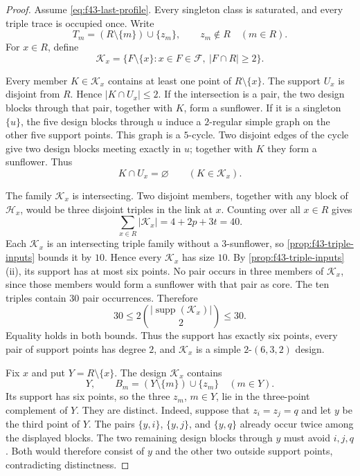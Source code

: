 \documentclass[11pt]{article}
\numberwithin{equation}{section}
\theoremstyle{definition}
\theoremstyle{remark}
\newcommand{\F}{\mathcal F}
\newcommand{\Hh}{\mathcal H}
\newcommand{\K}{\mathcal K}
\newcommand{\supp}{\operatorname{supp}}
\begin{document}
\begin{proof}
Assume \cref{eq:f43-last-profile}. Every singleton class is saturated, and
every triple trace is occupied once. Write
\[
 T_m=(R\setminus\{m\})\cup\{z_m\},
 \qquad z_m\notin R
 \quad(m\in R).
\]
For $x\in R$, define
\[
 \K_x=\{F\setminus\{x\}:x\in F\in\F,\ |F\cap R|\ge2\}.
\]

Every member $K\in\K_x$ contains at least one point of
$R\setminus\{x\}$. The support $U_x$ is disjoint from $R$. Hence
$|K\cap U_x|\le2$. If the intersection is a pair, the two design blocks
through that pair, together with $K$, form a sunflower. If it is a singleton
$\{u\}$, the five design blocks through $u$ induce a $2$-regular simple graph
on the other five support points. This graph is a $5$-cycle. Two disjoint
edges of the cycle give two design blocks meeting exactly in $u$; together
with $K$ they form a sunflower. Thus
\begin{equation}
 K\cap U_x=\varnothing\qquad(K\in\K_x).
 \label{eq:f43-K-avoids}
\end{equation}

The family $\K_x$ is intersecting. Two disjoint members, together with any
block of $\Hh_x$, would be three disjoint triples in the link at $x$.
Counting over all $x\in R$ gives
\[
 \sum_{x\in R}|\K_x|=4+2p+3t=40.
\]
Each $\K_x$ is an intersecting triple family without a $3$-sunflower, so
\cref{prop:f43-triple-inputs} bounds it by $10$. Hence every $\K_x$ has
size $10$. By \cref{prop:f43-triple-inputs}(ii), its support has at most six
points. No pair occurs in three members of $\K_x$, since those members would
form a sunflower with that pair as core. The ten triples contain $30$ pair
occurrences. Therefore
\[
 30\le2\binom{|\supp(\K_x)|}{2}\le30.
\]
Equality holds in both bounds. Thus the support has exactly six points, every
pair of support points has degree $2$, and $\K_x$ is a simple
$2$-$(6,3,2)$ design.

Fix $x$ and put $Y=R\setminus\{x\}$. The design $\K_x$ contains
\[
 Y,
 \qquad
 B_m=(Y\setminus\{m\})\cup\{z_m\}
 \quad(m\in Y).
\]
Its support has six points, so the three $z_m$, $m\in Y$, lie in the
three-point complement of $Y$. They are distinct. Indeed, suppose that
$z_i=z_j=q$ and let $y$ be the third point of $Y$. The pairs
$\{y,i\}$, $\{y,j\}$, and $\{y,q\}$ already occur twice among the displayed
blocks. The two remaining design blocks through $y$ must avoid $i,j,q$.
Both would therefore consist of $y$ and the other two outside support points,
contradicting distinctness.


\end{proof}
\end{document}
